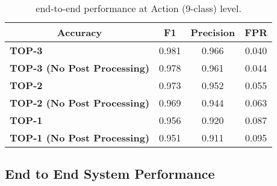 

    
        
    
    
        


    
    
    
    
    
        \begin{table}[htbp!]
                \centering\caption{\sys end-to-end performance at Action (9-class) level. }
                        \label{tab:e2e}
        \begin{tabular}{lccc}
        \toprule
        \multicolumn{1}{c}{\textbf{Accuracy}} & \textbf{F1} & \textbf{Precision}  & \textbf{FPR} \\
        \midrule
        \textbf{TOP-3}                    & 0.981 & 0.966  & 0.040  \\
        \textbf{TOP-3 (No Post Processing)} & 0.978 & 0.961  & 0.044  \\
        \textbf{TOP-2}                    & 0.973 & 0.952  & 0.055  \\
        \textbf{TOP-2 (No Post Processing)} & 0.969 & 0.944  & 0.063  \\
        \textbf{TOP-1}                    & 0.956 & 0.920  & 0.087  \\
        \textbf{TOP-1 (No Post Processing)} & 0.951 & 0.911  & 0.095  \\
        \bottomrule
        \end{tabular}
        \end{table}

\subsection{End to End System Performance}

